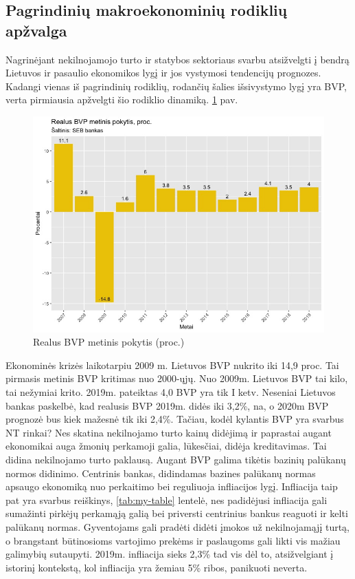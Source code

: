 \documentclass[11pt, titlepage]{article}
\begin{document}
\subsection{Pagrindinių makroekonominių rodiklių apžvalga}
Nagrinėjant nekilnojamojo turto ir statybos sektoriaus svarbu atsižvelgti į bendrą Lietuvos ir pasaulio ekonomikos lygį ir jos vystymosi tendencijų prognozes. Kadangi vienas iš pagrindinių rodiklių, rodančių šalies išsivystymo lygį yra BVP, verta pirmiausia apžvelgti šio rodiklio dinamiką. \ref{fig:Rplot3} pav.
\begin{figure}[H]
\center
\includegraphics[scale=0.5]{Rplot3}
\caption{Realus BVP metinis pokytis (proc.) }
\label{fig:Rplot3}
\end{figure}
Ekonominės krizės laikotarpiu 2009 m. Lietuvos BVP nukrito iki 14,9 proc. Tai pirmasis metinis BVP kritimas nuo 2000-ųjų. Nuo 2009m. Lietuvos BVP tai kilo, tai nežymiai krito. 2019m. pateiktas 4,0 BVP yra tik I ketv. Neseniai Lietuvos bankas paskelbė, kad realusis BVP  2019m.  didės iki 3,2\%, na, o 2020m BVP prognozė bus kiek mažesnė tik iki 2,4\%.  Tačiau, kodėl kylantis BVP yra svarbus NT rinkai? Nes skatina nekilnojamo turto kainų didėjimą ir paprastai augant ekonomikai auga žmonių perkamoji galia, lūkesčiai, didėja kreditavimas. Tai didina nekilnojamo turto paklausą. Augant BVP galima tikėtis bazinių palūkanų normos didinimo. Centrinis bankas, didindamas bazines palūkanų normas apsaugo ekonomiką nuo perkaitimo bei reguliuoja infliacijos lygį. Infliacija taip pat yra svarbus reiškinys, \ref{tab:my-table}  lentelė, nes padidėjusi infliacija gali sumažinti pirkėjų perkamąją galią bei priversti centrinius bankus reaguoti ir kelti palūkanų normas. Gyventojams gali pradėti didėti įmokos už nekilnojamąjį turtą, o brangstant būtinosioms vartojimo prekėms ir paslaugoms gali likti vis mažiau galimybių sutaupyti. 2019m. infliacija sieks 2,3\% tad vis dėl to, atsižvelgiant į istorinį kontekstą, kol infliacija yra žemiau 5\% ribos, panikuoti neverta. 
\end{document}
